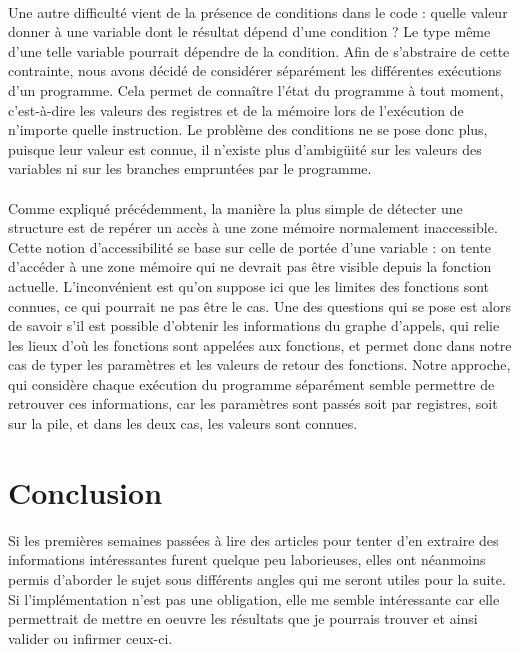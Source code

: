 \documentclass[a4paper,12pt]{article}
\begin{document}
\paragraph{}
Une autre difficulté vient de la présence de conditions dans le code :
quelle valeur donner à une variable dont le résultat dépend d'une 
condition ? Le type même d'une telle variable pourrait dépendre de la
condition. Afin de s'abstraire de cette contrainte, nous avons décidé de
considérer séparément les différentes exécutions d'un programme. Cela
permet de connaître l'état du programme à tout moment, c'est-à-dire les
valeurs des registres et de la mémoire lors de l'exécution de n'importe 
quelle instruction. Le problème des conditions ne se pose donc plus, puisque
leur valeur est connue, il n'existe plus d'ambigüité sur les valeurs des
variables ni sur les branches empruntées par le programme.
\paragraph{}
Comme expliqué précédemment, la manière la plus simple de détecter une
structure est de repérer un accès à une zone mémoire normalement
inaccessible. Cette notion d'accessibilité se base sur celle de portée
d'une variable : on tente d'accéder à une zone mémoire qui ne devrait pas
être visible depuis la fonction actuelle. L'inconvénient est qu'on suppose
ici que les limites des fonctions sont connues, ce qui pourrait ne pas être
le cas. Une des questions qui se pose est alors de savoir s'il est possible
d'obtenir les informations du graphe d'appels, qui relie les lieux d'où
les fonctions sont appelées aux fonctions, et permet donc dans notre
cas de typer les paramètres et les valeurs de retour des fonctions. Notre
approche, qui considère chaque exécution du programme séparément semble
permettre de retrouver ces informations, car les paramètres sont passés
soit par registres, soit sur la pile, et dans les deux cas, les valeurs sont
connues.


\section{Conclusion}

Si les premières semaines passées à lire des articles pour tenter
d'en extraire des informations intéressantes furent quelque peu 
laborieuses, elles ont néanmoins permis d'aborder le sujet sous différents
angles qui me seront utiles pour la suite. Si l'implémentation n'est pas
une obligation, elle me semble intéressante car elle permettrait de mettre
en oeuvre les résultats que je pourrais trouver et ainsi valider ou infirmer
ceux-ci. 
\end{document}
